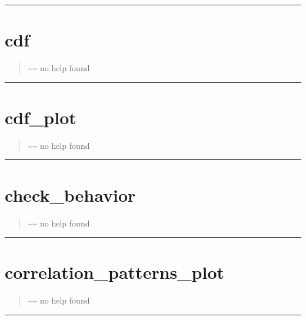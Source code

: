 \documentclass[letterpaper,10pt,english]{sphinxmanual}
\begin{document}
\bigskip\hrule{}\bigskip



\section{cdf}
\label{classes/utils/@mcf/mcf:cdf}\label{classes/utils/@mcf/mcf:id4}\begin{quote}

\textasciitilde{}\textasciitilde{} no help found
\end{quote}


\bigskip\hrule{}\bigskip



\section{cdf\_plot}
\label{classes/utils/@mcf/mcf:id5}\label{classes/utils/@mcf/mcf:cdf-plot}\begin{quote}

\textasciitilde{}\textasciitilde{} no help found
\end{quote}


\bigskip\hrule{}\bigskip



\section{check\_behavior}
\label{classes/utils/@mcf/mcf:id6}\label{classes/utils/@mcf/mcf:check-behavior}\begin{quote}

\textasciitilde{}\textasciitilde{} no help found
\end{quote}


\bigskip\hrule{}\bigskip



\section{correlation\_patterns\_plot}
\label{classes/utils/@mcf/mcf:correlation-patterns-plot}\label{classes/utils/@mcf/mcf:id7}\begin{quote}

\textasciitilde{}\textasciitilde{} no help found
\end{quote}


\bigskip\hrule{}\bigskip
\end{document}
